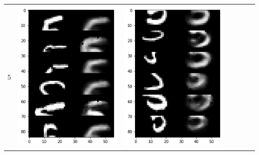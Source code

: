\documentclass[12pt]{report} %
\begin{document}
\begin{tabular}{m{0.7cm}m{2.4cm}m{2.4cm}m{2.4cm}m{2.4cm}m{2.4cm}m{2.4cm}}
	5 & \includegraphics[scale=0.3]{pictures/KE_5_up.png} & \includegraphics[scale=0.3]{pictures/KE_5_down.png} &

\end{tabular}
\end{document}
